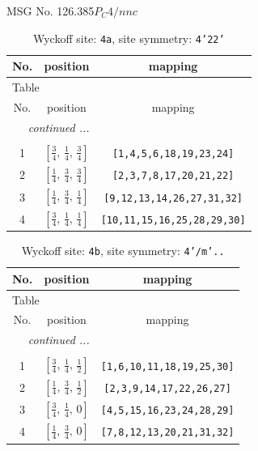 \documentclass[fleqn,8pt]{jsarticle}
\begin{document}
\setcounter{MaxMatrixCols}{32}

\renewcommand{\tablename}{Table~}
\renewcommand{\figurename}{Figure~}
\begin{center}
\LARGE
MSG No. 126.385\quad$P_{C}4/nnc$
\end{center}
\renewcommand{\arraystretch}{1.2}
\begin{longtable}{ccc}
\caption{Wyckoff site: {\tt 4a}, site symmetry: {\tt 4'22'}}
 \\
 \hline \hline
No. & position & mapping \\ \hline \endfirsthead

\multicolumn{2}{l}{\tablename\ \thetable{}} \\
 \hline \hline
No. & position & mapping \\ \hline \endhead

 \hline \hline
\multicolumn{2}{r}{\footnotesize\it continued ...} \\ \endfoot

 \hline \hline
\multicolumn{2}{r}{} \\ \endlastfoot

1 & $\left[ \frac{3}{4},\, \frac{1}{4},\, \frac{3}{4} \right]$ & {\tt [1,4,5,6,18,19,23,24]} \\ \hline
2 & $\left[ \frac{1}{4},\, \frac{3}{4},\, \frac{3}{4} \right]$ & {\tt [2,3,7,8,17,20,21,22]} \\ \hline
3 & $\left[ \frac{1}{4},\, \frac{3}{4},\, \frac{1}{4} \right]$ & {\tt [9,12,13,14,26,27,31,32]} \\ \hline
4 & $\left[ \frac{3}{4},\, \frac{1}{4},\, \frac{1}{4} \right]$ & {\tt [10,11,15,16,25,28,29,30]} \\
\end{longtable}
\renewcommand{\arraystretch}{1.2}
\begin{longtable}{ccc}
\caption{Wyckoff site: {\tt 4b}, site symmetry: {\tt 4'/m'..}}
 \\
 \hline \hline
No. & position & mapping \\ \hline \endfirsthead

\multicolumn{2}{l}{\tablename\ \thetable{}} \\
 \hline \hline
No. & position & mapping \\ \hline \endhead

 \hline \hline
\multicolumn{2}{r}{\footnotesize\it continued ...} \\ \endfoot

 \hline \hline
\multicolumn{2}{r}{} \\ \endlastfoot

1 & $\left[ \frac{3}{4},\, \frac{1}{4},\, \frac{1}{2} \right]$ & {\tt [1,6,10,11,18,19,25,30]} \\ \hline
2 & $\left[ \frac{1}{4},\, \frac{3}{4},\, \frac{1}{2} \right]$ & {\tt [2,3,9,14,17,22,26,27]} \\ \hline
3 & $\left[ \frac{3}{4},\, \frac{1}{4},\, 0 \right]$ & {\tt [4,5,15,16,23,24,28,29]} \\ \hline
4 & $\left[ \frac{1}{4},\, \frac{3}{4},\, 0 \right]$ & {\tt [7,8,12,13,20,21,31,32]} \\
\end{longtable}
\end{document}
